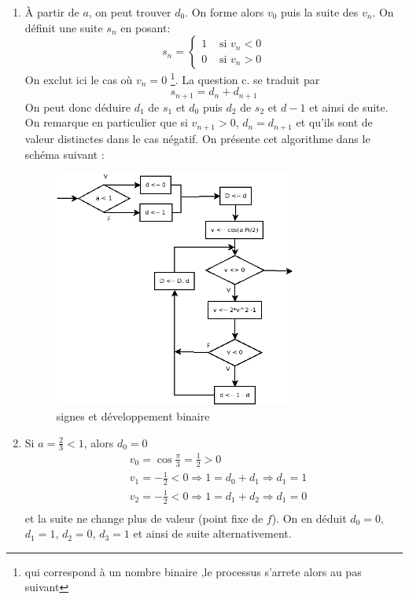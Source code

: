 \begin{enumerate}
 \item \`A partir de $a$, on peut trouver $d_0$. On forme alors $v_0$ puis la suite des $v_n$. On définit une suite $s_n$ en posant:
\begin{displaymath}
 s_n = \left\lbrace 
\begin{aligned}
 1&\text{ si } v_n<0 \\
 0&\text{ si } v_n>0 
\end{aligned}
\right. 
\end{displaymath}
On exclut ici le cas où $v_n=0$ \footnote{qui correspond à un nombre binaire ,le processus s'arrete alors au pas suivant}. La question c. se traduit par 
\begin{displaymath}
 s_{n+1}= d_n + d_{n+1}
\end{displaymath}
 On peut donc déduire $d_1$ de $s_1$ et $d_0$ puis $d_2$ de $s_2$ et $d-1$ et ainsi de suite. On remarque en particulier que si $v_{n+1}>0$, $d_n=d_{n+1}$ et qu'ils sont de valeur distinctes dans le cas négatif. On présente cet algorithme dans le schéma suivant :
\begin{figure}[htp]
 \centering
 \includegraphics[width=8cm]{./Cbincos_3.png}
 \caption{signes et développement binaire}
 \label{fig:Cbincos_3}
\end{figure}

\item Si $a =\frac{2}{3}<1$, alors $d_0=0$
\begin{align*}
 &v_{0} = \cos \frac{\pi }{3} = \frac{1}{2} >0 \\
 &v_{1}= -\frac{1}{2}<0 \Rightarrow 1 = d_0 + d_1 \Rightarrow d_1 = 1 \\ 
 &v_{2}= -\frac{1}{2}<0 \Rightarrow 1 = d_1 + d_2 \Rightarrow d_1 = 0 \\
\end{align*}
et la suite ne change plus de valeur (point fixe de $f$). On en d{\'e}duit $d_{0}=0$, $d_{1}=1$, $d_{2}=0$,
$d_{3}=1$ et ainsi de suite alternativement.


\end{enumerate}
